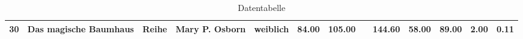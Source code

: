 \begin{sidewaystable}[ht]
\begin{center}
{\begin{tabular}{rllllrrlrrrrr}
  30 & Das magische Baumhaus                                                                                                                                                                                                                                           & Reihe & Mary P. Osborn                                                                                                                                                                                                                                                  & weiblich & 84.00 & 105.00 &                                                                                                                                                                                                                                                                 & 144.60 & 58.00 & 89.00 & 2.00 & 0.11 \\ 
   \hline
\end{tabular}
}
\caption{Datentabelle}
\label{merkmale}
\end{center}
\end{sidewaystable}%
